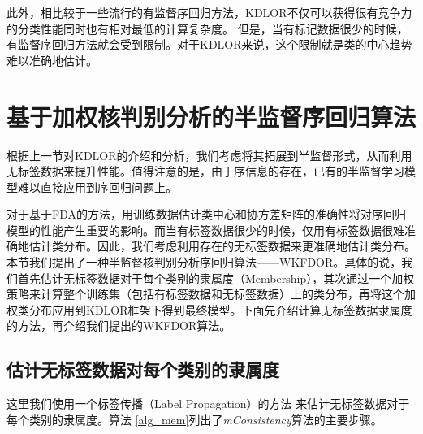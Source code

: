 此外，相比较于一些流行的有监督序回归方法，KDLOR不仅可以获得很有竞争力的分类性能同时也有相对最低的计算复杂度\citep{sun2010kernel}。
但是，当有标记数据很少的时候，有监督序回归方法就会受到限制。对于KDLOR来说，这个限制就是类的中心趋势难以准确地估计。

\section{基于加权核判别分析的半监督序回归算法}

根据上一节对KDLOR的介绍和分析，我们考虑将其拓展到半监督形式，从而利用无标签数据来提升性能。值得注意的是，由于序信息的存在，已有的半监督学习模型难以直接应用到序回归问题上。

对于基于FDA的方法，用训练数据估计类中心和协方差矩阵的准确性将对序回归模型的性能产生重要的影响。而当有标签数据很少的时候，仅用有标签数据很难准确地估计类分布。因此，我们考虑利用存在的无标签数据来更准确地估计类分布。本节我们提出了一种半监督核判别分析序回归算法——WKFDOR。具体的说，我们首先估计无标签数据对于每个类别的隶属度（Membership），其次通过一个加权策略来计算整个训练集（包括有标签数据和无标签数据）上的类分布，再将这个加权类分布应用到KDLOR框架下得到最终模型。下面先介绍计算无标签数据隶属度的方法，再介绍我们提出的WKFDOR算法。

\subsection{估计无标签数据对每个类别的隶属度}
这里我们使用一个标签传播（Label Propagation）的方法\citep{zhou2004learning}
来估计无标签数据对于每个类别的隶属度。算法 \ref{alg_mem}列出了\textit{mConsistency}算法的主要步骤。

